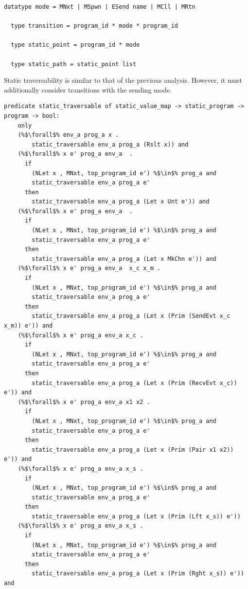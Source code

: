 \documentclass{article}
\begin{document}
\begin{lstlisting}[language=logic, escapechar=\%]
  datatype mode = MNxt | MSpwn | ESend name | MCll | MRtn

  type transition = program_id * mode * program_id

  type static_point = program_id * mode

  type static_path = static_point list
\end{lstlisting}

Static traversability is similar to that of the previous analysis.
However, it must additionally consider transitions with the sending mode. 

\begin{lstlisting}[language=logic, escapechar=\%]
  predicate static_traversable of static_value_map -> static_program -> program -> bool:
    only
    (%$\forall$% env_a prog_a x .
        static_traversable env_a prog_a (Rslt x)) and
    (%$\forall$% x e' prog_a env_a  .
      if
        (NLet x , MNxt, top_program_id e') %$\in$% prog_a and
        static_traversable env_a prog_a e'
      then
        static_traversable env_a prog_a (Let x Unt e')) and
    (%$\forall$% x e' prog_a env_a  .
      if
        (NLet x , MNxt, top_program_id e') %$\in$% prog_a and
        static_traversable env_a prog_a e'
      then
        static_traversable env_a prog_a (Let x MkChn e')) and
    (%$\forall$% x e' prog_a env_a  x_c x_m .
      if
        (NLet x , MNxt, top_program_id e') %$\in$% prog_a and
        static_traversable env_a prog_a e'
      then
        static_traversable env_a prog_a (Let x (Prim (SendEvt x_c x_m)) e')) and
    (%$\forall$% x e' prog_a env_a x_c .
      if
        (NLet x , MNxt, top_program_id e') %$\in$% prog_a and
        static_traversable env_a prog_a e'
      then
        static_traversable env_a prog_a (Let x (Prim (RecvEvt x_c)) e')) and
    (%$\forall$% x e' prog_a env_a x1 x2 .
      if
        (NLet x , MNxt, top_program_id e') %$\in$% prog_a and
        static_traversable env_a prog_a e'
      then
        static_traversable env_a prog_a (Let x (Prim (Pair x1 x2)) e')) and
    (%$\forall$% x e' prog_a env_a x_s .
      if
        (NLet x , MNxt, top_program_id e') %$\in$% prog_a and
        static_traversable env_a prog_a e'
      then
        static_traversable env_a prog_a (Let x (Prim (Lft x_s)) e'))
    (%$\forall$% x e' prog_a env_a x_s .
      if
        (NLet x , MNxt, top_program_id e') %$\in$% prog_a and
        static_traversable env_a prog_a e'
      then
        static_traversable env_a prog_a (Let x (Prim (Rght x_s)) e')) and

\end{lstlisting}
\end{document}
